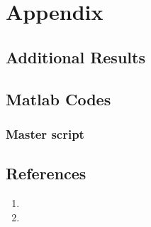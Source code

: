 \documentclass{report}
\begin{document}
\newpage
\chapter{Appendix}
\section{Additional Results}
\section{Matlab Codes}
\subsection{Master script}
%
\section{References}
\begin{enumerate}
\item 
\item
\end{enumerate}
\end{document}
